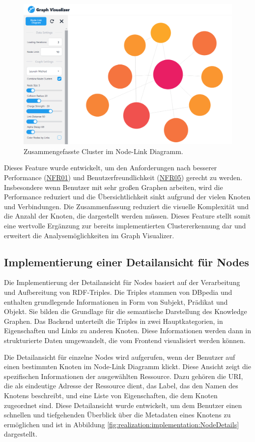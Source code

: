 \begin{figure}[h]
    \centering
    \includegraphics[height=.5\textwidth]{images/03/CombinedClusteringView.png}
    \caption{Zusammengefasste Cluster im Node-Link Diagramm.}
    \label{fig:realization:implementation:NodeLinkCombinedCluster}
\end{figure}

Dieses Feature wurde entwickelt, um den Anforderungen nach besserer Performance (\hyperref[NFR01]{NFR01}) und Benutzerfreundlichkeit (\hyperref[NFR05]{NFR05}) gerecht zu werden. Insbesondere wenn Benutzer mit sehr großen Graphen arbeiten, wird die Performance reduziert und die Übersichtlichkeit sinkt aufgrund der vielen Knoten und Verbindungen. Die Zusammenfassung reduziert die visuelle Komplexität und die Anzahl der Knoten, die dargestellt werden müssen. Dieses Feature stellt somit eine wertvolle Ergänzung zur bereits implementierten Clustererkennung dar und erweitert die Analysemöglichkeiten im Graph Visualizer.

\subsection{Implementierung einer Detailansicht für Nodes}

Die Implementierung der Detailansicht für Nodes basiert auf der Verarbeitung und Aufbereitung von RDF-Triples. Die Triples stammen von DBpedia und enthalten grundlegende Informationen in Form von Subjekt, Prädikat und Objekt. Sie bilden die Grundlage für die semantische Darstellung des Knowledge Graphen. Das Backend unterteilt die Triples in zwei Hauptkategorien, in Eigenschaften und Links zu anderen Knoten. Diese Informationen werden dann in strukturierte Daten umgewandelt, die vom Frontend visualisiert werden können.

Die Detailansicht für einzelne Nodes wird aufgerufen, wenn der Benutzer auf einen bestimmten Knoten im Node-Link Diagramm klickt. Diese Ansicht zeigt die spezifischen Informationen der ausgewählten Ressource. Dazu gehören die URI, die als eindeutige Adresse der Ressource dient, das Label, das den Namen des Knotens beschreibt, und eine Liste von Eigenschaften, die dem Knoten zugeordnet sind. Diese Detailansicht wurde entwickelt, um dem Benutzer einen schnellen und tiefgehenden Überblick über die Metadaten eines Knotens zu ermöglichen und ist in Abbildung \ref{fig:realization:implementation:NodeDetails} dargestellt.


